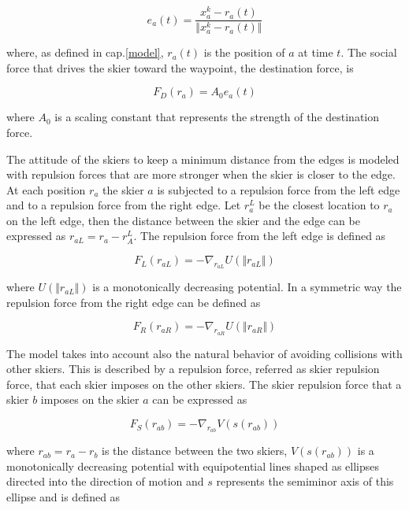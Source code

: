 \documentclass[12pt,a4paper,twoside]{book}
\begin{document}
\begin{equation}\label{waypoint_direction}
e_a(t)=\frac{x^k_a-r_a(t)}{\Vert x^k_a-r_a(t) \Vert}
\end{equation}

where, as defined in cap.\ref{model}, $r_a(t)$ is the position of $a$ at time $t$. The social force that drives the skier toward the waypoint, the destination force, is

\begin{equation}\label{destination_force}
F_D(r_a)=A_0 e_a(t)
\end{equation}

where $A_0$ is a scaling constant that represents the strength of the destination force.

The attitude of the skiers to keep a minimum distance from the edges is modeled with repulsion forces that are more stronger when the skier is closer to the edge. At each position $r_a$ the skier $a$ is subjected to a repulsion force from the left edge and to a repulsion force from the right edge. Let $r_a^L$ be the closest location to $r_a$ on the left edge, then the distance between the skier and the edge can be expressed as $r_{aL}=r_a-r_A^L$. The repulsion force from the left edge is defined as

\begin{equation}\label{left_force}
F_L(r_{aL})=-\nabla_{r_{aL}}U(\Vert r_{aL} \Vert )
\end{equation}

where $U(\Vert r_{aL} \Vert )$ is a monotonically decreasing potential. In a symmetric way the repulsion force from the right edge can be defined as

\begin{equation}\label{right_force}
F_R(r_{aR})=-\nabla_{r_{aR}}U(\Vert r_{aR} \Vert )
\end{equation}

The model takes into account also the natural behavior of avoiding collisions with other skiers. This is described by a repulsion force, referred as skier repulsion force, that each skier imposes on the other skiers. The skier repulsion force that a skier $b$ imposes on the skier $a$ can be expressed as

\begin{equation}\label{skier_force}
F_S(r_{ab})=-\nabla_{r_{ab}}V(s(r_{ab}))
\end{equation}

where $r_{ab}=r_a-r_b$ is the distance between the two skiers, $V(s(r_{ab}))$ is a monotonically decreasing potential with equipotential lines shaped as ellipses directed into the direction of motion and $s$ represents the semiminor axis of this ellipse and is defined as
\end{document}
